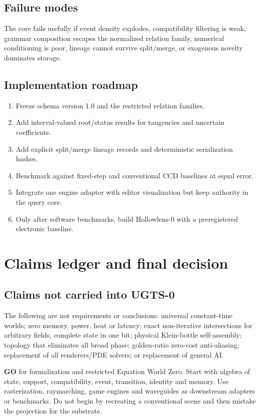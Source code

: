 \documentclass[10.5pt,a4paper,openany]{book}
\begin{document}
\section{Failure modes}
The core fails usefully if event density explodes, compatibility filtering is weak, grammar composition escapes the normalized relation family, numerical conditioning is poor, lineage cannot survive split/merge, or exogenous novelty dominates storage.

\section{Implementation roadmap}
\begin{enumerate}
\item Freeze schema version 1.0 and the restricted relation families.
\item Add interval-valued root/status results for tangencies and uncertain coefficients.
\item Add explicit split/merge lineage records and deterministic serialization hashes.
\item Benchmark against fixed-step and conventional CCD baselines at equal error.
\item Integrate one engine adapter with editor visualization but keep authority in the query core.
\item Only after software benchmarks, build Hollowlens-0 with a preregistered electronic baseline.
\end{enumerate}

\chapter{Claims ledger and final decision}
\section{Claims not carried into UGTS-0}
The following are not requirements or conclusions: universal constant-time worlds; zero memory, power, heat or latency; exact non-iterative intersections for arbitrary fields; complete state in one bit; physical Klein-bottle self-assembly; topology that eliminates all broad phase; golden-ratio zero-cost anti-aliasing; replacement of all renderers/PDE solvers; or replacement of general AI.



\begin{decisionbox}
\textbf{GO} for formalization and restricted Equation World Zero. Start with algebra of state, support, compatibility, event, transition, identity and memory. Use rasterization, raymarching, game engines and waveguides as downstream adapters or benchmarks. Do not begin by recreating a conventional scene and then mistake the projection for the substrate.
\end{decisionbox}
\end{document}
